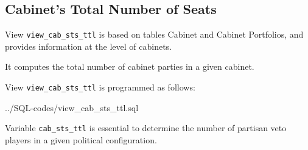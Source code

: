 \subsection{Cabinet's Total Number of Seats}\label{view_cab_sts_ttl}
View \texttt{\footnotesize view\_cab\_sts\_ttl} is based on tables Cabinet and Cabinet Portfolios, and provides information at the level of cabinets. 

It computes the total number of cabinet parties in a given cabinet.

View \texttt{\footnotesize view\_cab\_sts\_ttl} is programmed as follows:

%
{../SQL-codes/view_cab_sts_ttl.sql}


Variable \texttt{\footnotesize cab\_sts\_ttl} is essential to determine the number of partisan veto players in a given political configuration.

